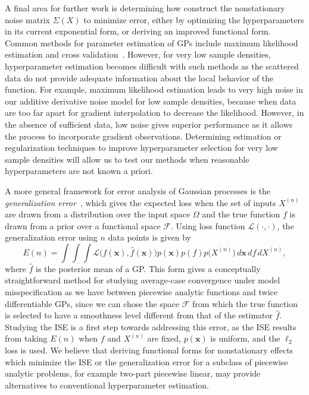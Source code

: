 \documentclass{article}
\renewcommand{\vec}[1]{\mathbf{#1}}
\numberwithin{equation}{section}
\begin{document}
A final area for further work is determining how construct the nonstationary noise matrix $\Sigma(X)$ to minimize error, either by optimizing the hyperparameters in its current exponential form, or deriving an improved functional form. Common methods for parameter estimation of GPs include maximum likelihood estimation and cross validation~\cite{rasmussen2003gaussian}. However, for very low sample densities, hyperparameter estimation becomes difficult with such methods as the scattered data do not provide adequate information about the local behavior of the function. For example, maximum likelihood estimation leads to very high noise in our additive derivative noise model for low sample densities, because when data are too far apart for gradient interpolation to decrease the likelihood. However, in the absence of sufficient data, low noise gives superior performance as it allows the process to incorporate gradient observations. Determining estimation or regularization techniques to improve hyperparameter selection for very low sample densities will allow us to test our methods when reasonable hyperparameters are not known a priori.

A more general framework for error analysis of Gaussian processes is the \textit{generalization error}~\cite{rasmussen2003gaussian, sollich1999learning}, which gives the expected loss when the set of inputs $X^{(n)}$ are drawn from a distribution over the input space $\Omega$ and the true function $f$ is drawn from a prior over a functional space $\mathcal{F}$. Using loss function $\mathcal{L}(\cdot, \cdot)$, the generalization error using $n$ data points is given by
$$ E(n) = \int \int \int \mathcal{L}\Big(f(\vec{x}), \hat{f}(\vec{x})\Big) p(\vec{x}) p(f) p\big(X^{(n)}\big) \, d\vec{x} \, df \,  dX^{(n)},$$
where $\hat{f}$ is the posterior mean of a GP. This form gives a conceptually straightforward method for studying average-case convergence under model misspecification as we have between piecewise analytic functions and twice differentiable GPs, since we can chose the space $\mathcal{F}$ from which the true function is selected to have a smoothness level different from that of the estimator $\hat{f}$. Studying the ISE is a first step towards addressing this error, as the ISE results from taking $E(n)$ when $f$ and $X^{(n)}$ are fixed, $p(\vec{x})$ is uniform, and the $\ell_2$ loss is used. We believe that deriving functional forms for nonstationary effects which minimize the ISE or the generalization error for a subclass of piecewise analytic problems, for example two-part piecewise linear, may provide alternatives to conventional hyperparameter estimation.

\newpage

{}

\end{document}
